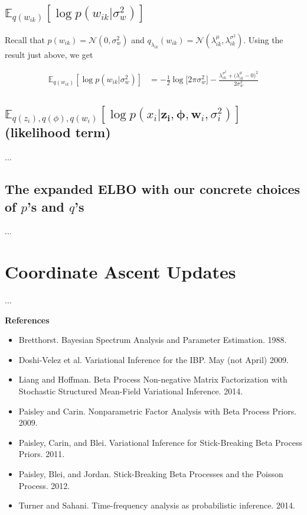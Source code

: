 \documentclass[11pt]{article}
\theoremstyle{definition}
\theoremstyle{plain}
\newcommand{\E}{\mathbb{E}}
\begin{document}
\subsection{$\E_{q(w_{ik})}[ \log p(w_{ik}|\sigma^2_w)]$}



\noindent Recall that $p(w_{ik}) = \mathcal{N}(0, \sigma^2_w)$
and $q_{\lambda_{ik}}(w_{ik}) = 
\mathcal{N}(\lambda_{ik}^{\mu}, \lambda_{ik}^{\sigma^2})$. Using the result just
above, we get






\begin{align*}
    \E_{q(w_{ik})}[ \log p(w_{ik}|\sigma^2_w)] &=
    - \frac{1}{2} \log \Big[2 \pi \sigma^2_{w} \Big]
              - \frac{\lambda_{ik}^{\sigma^2} 
              + \big(\lambda_{ik}^{\mu} - 0 \big)^2}{2 \sigma^2_{w}}
\end{align*}


\subsection{$\E_{q(z_i),q(\phi),q(w_i)}[\log p(x_i | \mathbf{z_i}, \boldsymbol{\phi}, \mathbf{w}_i, \sigma^2_i)]$ (likelihood term)}

...

\subsection{The expanded ELBO with our concrete choices of $p$'s and $q$'s}

...

\section{Coordinate Ascent Updates}

...


\begin{center} \textbf{References} \end{center}
    \begin{itemize}
        \item Bretthorst. Bayesian Spectrum Analysis and Parameter Estimation. 1988.
        \item Doshi-Velez et al. Variational Inference for the IBP. May (not April) 2009.
        \item Liang and Hoffman. Beta Process Non-negative Matrix Factorization with Stochastic Structured Mean-Field Variational Inference. 2014.
        \item Paisley and Carin. Nonparametric Factor Analysis with Beta Process Priors. 2009.
        \item Paisley, Carin, and Blei. Variational Inference for Stick-Breaking Beta Process Priors. 2011.
        \item Paisley, Blei, and Jordan. Stick-Breaking Beta Processes and the Poisson Process. 2012.
        \item Turner and Sahani. Time-frequency analysis as probabilistic inference. 2014. 
    \end{itemize}
\end{document}
